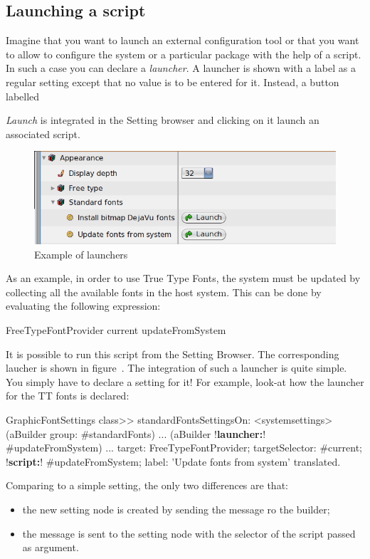 \documentclass[a4paper,10pt,twoside]{book}
\begin{document}
\subsection{Launching a script}
Imagine that you want to launch an external configuration tool or that you want to allow to configure the system or a particular package with the help of a script. In such a case you can declare a \textit{launcher}. A launcher is shown with a label as a regular setting except that no value is to be entered for it. Instead, a button labelled {\textit{Launch} is integrated in the Setting browser and clicking on it launch an associated script.

\begin{figure}[tbh]
\begin{center}
\includegraphics[scale=0.38]{launcher}
\caption{Example of launchers}
\end{center}
\end{figure}

As an example, in order to use True Type Fonts, the system must be updated by collecting all the available fonts in the host system. This can be done by evaluating the following expression:
\begin{code}{}
FreeTypeFontProvider current updateFromSystem
\end{code}
It is  possible to run this script from the Setting Browser. The corresponding laucher is shown in figure~.
The integration of such a launcher is quite simple. You simply have to declare a setting for it! For example, look-at how the launcher for the TT fonts is declared:
\begin{code}{}
GraphicFontSettings class>> standardFontsSettingsOn:
	<systemsettings>
	(aBuilder group: #standardFonts)
		...
		(aBuilder !\textbf{launcher:}! #updateFromSystem) ...
				target: FreeTypeFontProvider;
				targetSelector: #current;
				!\textbf{script:}! #updateFromSystem;
				label: 'Update fonts from system' translated.
\end{code}
Comparing to a simple setting, the only two differences are that:
\begin{itemize}
\item 
	the new setting node is created by sending the  message ro the builder;
\item
	the message  is sent to the setting node with the selector of the script passed as argument.
\end{itemize}

}
\end{document}
